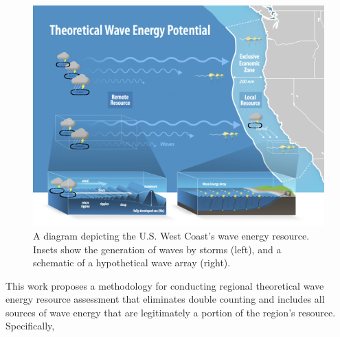 \begin{figure}[ht]
\centering
\includegraphics[width=\linewidth]{../fig/NREL-water-NatureEnergyGraphic-Levi-FY21-jfrenzl-v5.png}
\caption{A diagram depicting the U.S. West Coast's wave energy resource. Insets show the generation of waves by storms (left), and a schematic of a hypothetical wave array (right).}
\label{fig:diagram:west-eez}
\end{figure}

This work proposes a methodology for conducting regional theoretical wave energy resource assessment that eliminates double counting and includes all sources of wave energy that are legitimately a portion of the region's resource. Specifically,

